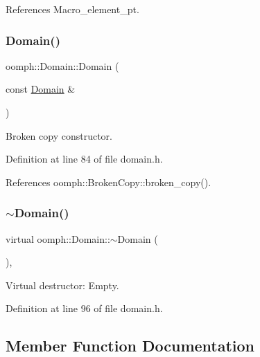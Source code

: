 References Macro\+\_\+element\+\_\+pt.

\mbox{\label{classoomph_1_1Domain_a3ca7b8845faa8689ec8d2c396383bc29}} 
\subsubsection{\texorpdfstring{Domain()}{Domain()}\hspace{0.1cm}{\footnotesize\ttfamily [2/2]}}
{\footnotesize\ttfamily oomph\+::\+Domain\+::\+Domain (\begin{DoxyParamCaption}\item[{const \hyperlink{classoomph_1_1Domain}{Domain} \&}]{ }\end{DoxyParamCaption})\hspace{0.3cm}{\ttfamily [inline]}}



Broken copy constructor. 



Definition at line 84 of file domain.\+h.



References oomph\+::\+Broken\+Copy\+::broken\+\_\+copy().

\mbox{\label{classoomph_1_1Domain_afd6c101003640d74becabcd8f1dcbc67}} 
\subsubsection{\texorpdfstring{$\sim$\+Domain()}{~Domain()}}
{\footnotesize\ttfamily virtual oomph\+::\+Domain\+::$\sim$\+Domain (\begin{DoxyParamCaption}{ }\end{DoxyParamCaption})\hspace{0.3cm}{\ttfamily [inline]}, {\ttfamily [virtual]}}



Virtual destructor\+: Empty. 



Definition at line 96 of file domain.\+h.



\subsection{Member Function Documentation}
\mbox{\label{classoomph_1_1Domain_afeeb40f9179abe710f14effbe4db42a1}} 
